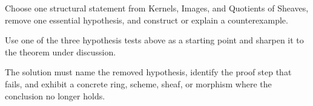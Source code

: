 \begin{exercise}\label{exr:vi15-expand-16}
Choose one structural statement from Kernels, Images, and Quotients of Sheaves, remove one essential hypothesis, and construct or explain a counterexample.
\end{exercise}
\begin{hint}
Use one of the three hypothesis tests above as a starting point and sharpen it to the theorem under discussion.
\end{hint}
\begin{solution}
The solution must name the removed hypothesis, identify the proof step that fails, and exhibit a concrete ring, scheme, sheaf, or morphism where the conclusion no longer holds.
\end{solution}

